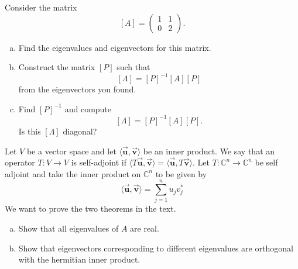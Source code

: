 \documentclass[12pt]{amsbook}
\newcommand{\C}{\mathbb{C}}
\newcommand{\blade}[1]{\boldsymbol{\vec{#1}}}
\begin{document}
\newpage
\begin{problem}
Consider the matrix
\[
[A] = \begin{pmatrix} 1 & 1 \\ 0 & 2 \end{pmatrix}.
\]
\begin{enumerate}[(a)]
    \item Find the eigenvalues and eigenvectors for this matrix.
    \item Construct the matrix $[P]$ such that
    \[
    [\Lambda] = [P]^{-1}[A][P]
    \]
    from the eigenvectors you found.
    \item Find $[P]^{-1}$ and compute
    \[
    [\Lambda] = [P]^{-1}[A][P].
    \]
    Is this $[\Lambda]$ diagonal?
\end{enumerate}
\end{problem}

\newpage
\begin{problem}[BONUS]
Let $V$ be a vector space and let $\langle \blade{u},\blade{v} \rangle$ be an inner product. We say that an operator $T\colon V \to V$ is self-adjoint if $\langle T\blade{u},\blade{v}\rangle = \langle \blade{u},T\blade{v}\rangle$. Let $T \colon \C^n \to \C^n$ be self adjoint and take the inner product on $\C^n$ to be given by
\[
\langle \blade{u},\blade{v}\rangle = \sum_{j=1}^n u_j v_j^*
\]
We want to prove the two theorems in the text.
\begin{enumerate}[(a)]
    \item Show that all eigenvalues of $A$ are real.
    \item Show that eigenvectors corresponding to different eigenvalues are orthogonal with the hermitian inner product.
\end{enumerate}
\end{problem}
\end{document}
